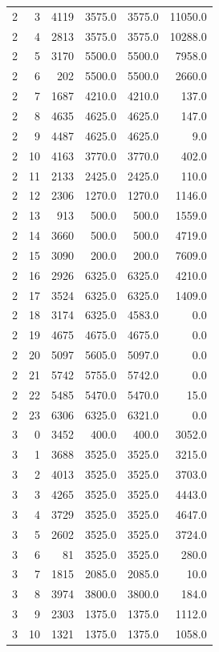 \begin{longtable}{rrrrrr}
2 & 3 & 4119 & 3575.0 & 3575.0 & 11050.0\\
2 & 4 & 2813 & 3575.0 & 3575.0 & 10288.0\\
2 & 5 & 3170 & 5500.0 & 5500.0 & 7958.0\\
2 & 6 & 202 & 5500.0 & 5500.0 & 2660.0\\
2 & 7 & 1687 & 4210.0 & 4210.0 & 137.0\\
2 & 8 & 4635 & 4625.0 & 4625.0 & 147.0\\
2 & 9 & 4487 & 4625.0 & 4625.0 & 9.0\\
2 & 10 & 4163 & 3770.0 & 3770.0 & 402.0\\
2 & 11 & 2133 & 2425.0 & 2425.0 & 110.0\\
2 & 12 & 2306 & 1270.0 & 1270.0 & 1146.0\\
2 & 13 & 913 & 500.0 & 500.0 & 1559.0\\
2 & 14 & 3660 & 500.0 & 500.0 & 4719.0\\
2 & 15 & 3090 & 200.0 & 200.0 & 7609.0\\
2 & 16 & 2926 & 6325.0 & 6325.0 & 4210.0\\
2 & 17 & 3524 & 6325.0 & 6325.0 & 1409.0\\
2 & 18 & 3174 & 6325.0 & 4583.0 & 0.0\\
2 & 19 & 4675 & 4675.0 & 4675.0 & 0.0\\
2 & 20 & 5097 & 5605.0 & 5097.0 & 0.0\\
2 & 21 & 5742 & 5755.0 & 5742.0 & 0.0\\
2 & 22 & 5485 & 5470.0 & 5470.0 & 15.0\\
2 & 23 & 6306 & 6325.0 & 6321.0 & 0.0\\
3 & 0 & 3452 & 400.0 & 400.0 & 3052.0\\
3 & 1 & 3688 & 3525.0 & 3525.0 & 3215.0\\
3 & 2 & 4013 & 3525.0 & 3525.0 & 3703.0\\
3 & 3 & 4265 & 3525.0 & 3525.0 & 4443.0\\
3 & 4 & 3729 & 3525.0 & 3525.0 & 4647.0\\
3 & 5 & 2602 & 3525.0 & 3525.0 & 3724.0\\
3 & 6 & 81 & 3525.0 & 3525.0 & 280.0\\
3 & 7 & 1815 & 2085.0 & 2085.0 & 10.0\\
3 & 8 & 3974 & 3800.0 & 3800.0 & 184.0\\
3 & 9 & 2303 & 1375.0 & 1375.0 & 1112.0\\
3 & 10 & 1321 & 1375.0 & 1375.0 & 1058.0\\

\end{longtable}
